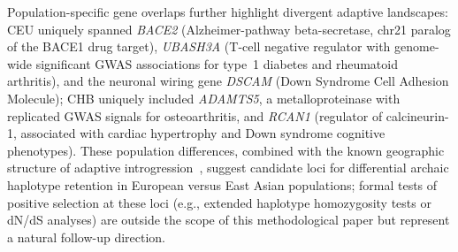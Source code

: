 Population-specific gene overlaps further highlight divergent adaptive landscapes:
CEU uniquely spanned \emph{BACE2} (Alzheimer-pathway beta-secretase, chr21 paralog
of the BACE1 drug target), \emph{UBASH3A} (T-cell negative regulator with
genome-wide significant GWAS associations for type~1 diabetes and rheumatoid arthritis),
and the neuronal wiring gene \emph{DSCAM} (Down Syndrome Cell Adhesion Molecule);
CHB uniquely included \emph{ADAMTS5}, a metalloproteinase with replicated GWAS
signals for osteoarthritis, and \emph{RCAN1} (regulator of calcineurin-1,
associated with cardiac hypertrophy and Down syndrome cognitive phenotypes).
These population differences, combined with the known geographic structure of
adaptive introgression~\citep{vernot2016excavating}, suggest candidate loci
for differential archaic haplotype retention in European versus East Asian
populations; formal tests of positive selection at these loci (e.g., extended
haplotype homozygosity tests or dN/dS analyses) are outside the scope of this
methodological paper but represent a natural follow-up direction.
